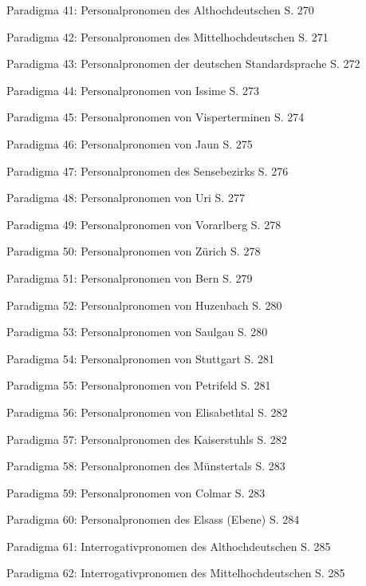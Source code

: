 Paradigma 41: Personalpronomen des Althochdeutschen \citep[241–245]{Braune2004}  S. 270

Paradigma 42: Personalpronomen des Mittelhochdeutschen \citep[210–214]{Paul2007}  S. 271

Paradigma 43: Personalpronomen der deutschen Standardsprache \citep[169–177]{Eisenberg2006}  S. 272

Paradigma 44: Personalpronomen von Issime \citep[206–312]{Zürrer1999}  S. 273

Paradigma 45: Personalpronomen von Visperterminen \citep[139–141]{Wipf1911}  S. 274

Paradigma 46: Personalpronomen von Jaun \citep[280–282]{Stucki1917}  S. 275

Paradigma 47: Personalpronomen des Sensebezirks \citep[196–198]{Henzen1927}  S. 276

Paradigma 48: Personalpronomen von Uri \citep[190–192]{Clauß1928}  S. 277

Paradigma 49: Personalpronomen von Vorarlberg \citep[271–274]{Jutz1925}  S. 278

Paradigma 50: Personalpronomen von Zürich \citep[153–162]{Weber1987}  S. 278

Paradigma 51: Personalpronomen von Bern \citep[92–97]{Marti1985}  S. 279

Paradigma 52: Personalpronomen von Huzenbach \citep[102–103]{Baur1967}  S. 280

Paradigma 53: Personalpronomen von Saulgau \citep[116–117]{Raichle1932}  S. 280

Paradigma 54: Personalpronomen von Stuttgart \citep[160–161]{Frey1975}  S. 281

Paradigma 55: Personalpronomen von Petrifeld \citep[64–65]{Moser1937}  S. 281

Paradigma 56: Personalpronomen von Elisabethtal \citep[52]{Žirmunskij1928/29}  S. 282

Paradigma 57: Personalpronomen des Kaiserstuhls \citep[393–398]{Noth1993}  S. 282

Paradigma 58: Personalpronomen des Münstertals \citep[46–47]{Mankel1886}  S. 283

Paradigma 59: Personalpronomen von Colmar \citep[81–83]{Henry1900}  S. 283

Paradigma 60: Personalpronomen des Elsass (Ebene) \citep[151–159]{Beyer1963}  S. 284

Paradigma 61: Interrogativpronomen des Althochdeutschen \citep[252–253]{Braune2004}  S. 285

Paradigma 62: Interrogativpronomen des Mittelhochdeutschen \citep[222–223]{Paul2007}  S. 285

